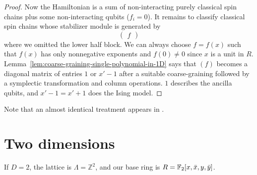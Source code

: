 \begin{proof}
Now the Hamiltonian is a sum of non-interacting purely classical spin chains
plus some non-interacting qubits ($f_i = 0$).
It remains to classify classical spin chains
whose stabilizer module is generated by
\[
\begin{pmatrix}
f
\end{pmatrix}
\]
where we omitted the lower half block.
We can always choose $f=f(x)$ such that $f(x)$ has only nonnegative exponents and
$f(0)\ne 0$ since $x$ is a unit in $R$.
Lemma~\ref{lem:coarse-graining-single-polynomial-in-1D} says that
$(f)$ becomes a diagonal matrix of entries $1$ or $x'-1$
after a suitable coarse-graining followed by a symplectic transformation
and column operations.
$1$ describes the ancilla qubits,
and $x'-1 = x'+1$ does the Ising model.
\end{proof}
Note that an almost identical treatment appears in \cite{GrasslRotteler2006Convolutional}.

\section{Two dimensions}
If $D=2$, the lattice is $\Lambda = \mathbb{Z}^2$, and our base ring is $R = \mathbb{F}_2 [x,\bar x, y, \bar y]$.

